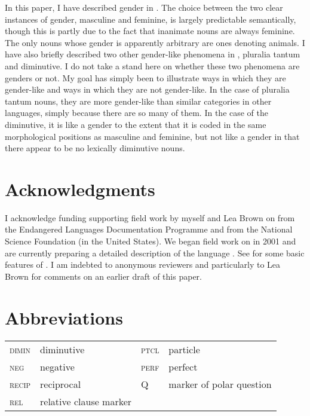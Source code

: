 \documentclass[output=collectionpaper]{langsci/langscibook}
\begin{document}
In this paper, I have described gender in . The choice between the two clear instances of gender, masculine and feminine, is largely predictable semantically, though this is partly due to the fact that inanimate nouns are always feminine. The only nouns whose gender is apparently arbitrary are ones denoting animals. I have also briefly described two other gender-like phenomena in , pluralia tantum and diminutive. I do not take a stand here on whether these two phenomena are genders or not. My goal has simply been to illustrate ways in which they are gender-like and ways in which they are not gender-like. In the case of pluralia tantum nouns, they are more gender-like than similar categories in other languages, simply because there are so many of them. In the case of the diminutive, it is like a gender to the extent that it is coded in the same morphological positions as masculine and feminine, but not like a gender in that there appear to be no lexically diminutive nouns.

\section*{Acknowledgments}
I acknowledge funding supporting field work by myself and Lea Brown on  from the Endangered Languages Documentation Programme and from the National Science Foundation (in the United States). We began field work on  in 2001 and are currently preparing a detailed description of the language \citep{DryerInpreparation}. See \citet{Brown2008} for some basic features of . I am indebted to anonymous reviewers and particularly to Lea Brown for comments on an earlier draft of this paper.

\section*{Abbreviations}

\begin{tabular}{llll}
 \textsc{dimin} & diminutive &   \textsc{ptcl} & particle\\
 \textsc{neg} & negative & \textsc{perf} & perfect\\
 \textsc{recip} & reciprocal &  Q & marker of polar question\\
\textsc{rel} & relative clause marker &&\\
\end{tabular}

\printbibliography[heading=subbibliography,notkeyword=this]
\end{document}
